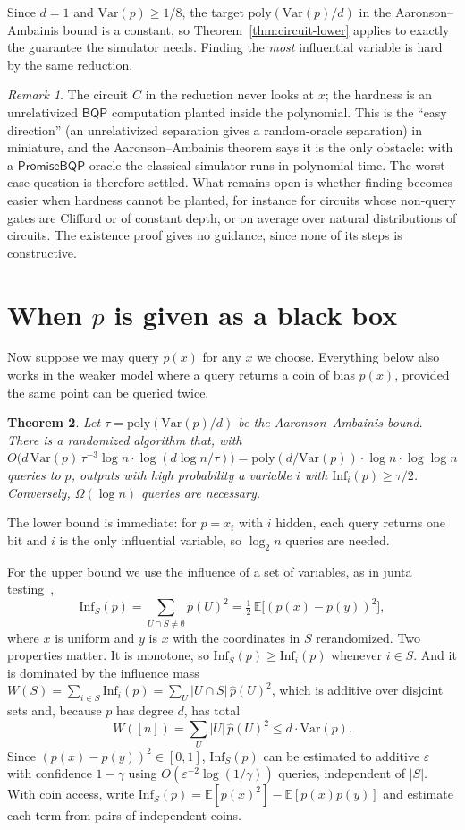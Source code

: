 \documentclass[11pt]{article}
\newtheorem{theorem}{Theorem}
\theoremstyle{remark}
\newtheorem{remark}[theorem]{Remark}
\newcommand{\Inf}{\mathrm{Inf}}
\newcommand{\Var}{\mathrm{Var}}
\newcommand{\E}{\mathbb{E}}
\newcommand{\poly}{\mathrm{poly}}
\newcommand{\PromiseBQP}{\mathsf{PromiseBQP}}
\begin{document}
Since $d=1$ and $\Var(p)\ge1/8$, the target $\poly(\Var(p)/d)$ in the
Aaronson--Ambainis bound is a constant, so Theorem~\ref{thm:circuit-lower} applies to
exactly the guarantee the simulator needs. Finding the \emph{most} influential variable
is hard by the same reduction.

\begin{remark}
The circuit $C$ in the reduction never looks at $x$; the hardness is an unrelativized
$\mathsf{BQP}$ computation planted inside the polynomial. This is the ``easy direction''
(an unrelativized separation gives a random-oracle separation) in miniature, and the
Aaronson--Ambainis theorem says it is the only obstacle: with a $\PromiseBQP$ oracle the
classical simulator runs in polynomial time. The worst-case question is therefore
settled. What remains open is whether finding becomes easier when hardness cannot be
planted, for instance for circuits whose non-query gates are Clifford or of constant
depth, or on average over natural distributions of circuits. The existence proof gives
no guidance, since none of its steps is constructive.
\end{remark}

\section{When \texorpdfstring{$p$}{p} is given as a black box}

Now suppose we may query $p(x)$ for any $x$ we choose. Everything below also works in the
weaker model where a query returns a coin of bias $p(x)$, provided the same point can be
queried twice.

\begin{theorem}\label{thm:blackbox}
Let $\tau=\poly(\Var(p)/d)$ be the Aaronson--Ambainis bound. There is a randomized
algorithm that, with
$O\big(d\,\Var(p)\,\tau^{-3}\log n\cdot\log(d\log n/\tau)\big)=\poly(d/\Var(p))\cdot
\log n\cdot\log\log n$ queries to $p$, outputs with high probability a variable $i$ with
$\Inf_i(p)\ge\tau/2$. Conversely, $\Omega(\log n)$ queries are necessary.
\end{theorem}

The lower bound is immediate: for $p=x_i$ with $i$ hidden, each query returns one bit
and $i$ is the only influential variable, so $\log_2 n$ queries are needed.

For the upper bound we use the influence of a set of variables, as in junta
testing~\cite{FKRSS04,Blais09},
\[
\Inf_S(p)=\sum_{U\cap S\neq\emptyset}\hat p(U)^2=\tfrac12\,\E\big[(p(x)-p(y))^2\big],
\]
where $x$ is uniform and $y$ is $x$ with the coordinates in $S$ rerandomized. Two
properties matter. It is monotone, so $\Inf_S(p)\ge\Inf_i(p)$ whenever $i\in S$. And
it is dominated by the influence mass $W(S)=\sum_{i\in S}\Inf_i(p)=\sum_U|U\cap
S|\,\hat p(U)^2$, which is additive over disjoint sets and, because $p$ has degree $d$,
has total
\[
W([n])=\sum_U|U|\,\hat p(U)^2\le d\cdot\Var(p).
\]
Since $(p(x)-p(y))^2\in[0,1]$, $\Inf_S(p)$ can be estimated to additive $\varepsilon$ with
confidence $1-\gamma$ using $O(\varepsilon^{-2}\log(1/\gamma))$ queries, independent of
$|S|$. With coin access, write $\Inf_S(p)=\E[p(x)^2]-\E[p(x)p(y)]$ and estimate each
term from pairs of independent coins.
\end{document}
